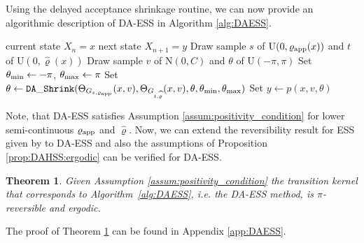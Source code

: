\documentclass[sn-mathphys-num]{sn-jnl}%
\theoremstyle{thmstyleone}%
\newtheorem{theorem}{Theorem}%
\theoremstyle{thmstyletwo}%
\theoremstyle{thmstylethree}%
\newcommand{\rhoapp}{\varrho_{{\rm app}}}
\newcommand{\change}[1]{\bgroup\color{black}#1\egroup}    %
\begin{document}
Using the delayed acceptance shrinkage routine, we can now provide an algorithmic description of DA-ESS in Algorithm \ref{alg:DAESS}.

\begin{algorithm}
	\caption{Delayed Acceptance Elliptical Slice Sampling}\label{alg:DAESS}
	\renewcommand{\algorithmicrequire}{\textbf{Input:}}
	\renewcommand{\algorithmicensure}{\textbf{Output:}}
	\begin{algorithmic}[1]
		\Require current state $X_n = x$
	    \Ensure next state $X_{n+1} = y$
		\State Draw sample $s$ of $\mathrm{U}(0,\rhoapp(x))$ and $t$ of $\mathrm{U}(0,\widehat{\varrho}(x))$
	    \State Draw sample $v$ of $\mathrm{N}(0,C)$ and $\theta$ of \change{$\mathrm{U}(-\pi,\pi)$}
	    \State Set $\theta_{\text{min}}\leftarrow \change{-\pi}$, $\theta_{\text{max}}\leftarrow \change{\pi}$
        \State Set $\theta \leftarrow \mathtt{DA\text{\_}Shrink}(\Theta_{G_{s,\rhoapp}}(x,v), \Theta_{G_{t,\widehat{\varrho}}}(x,v), \theta, \theta_{\text{min}}, \theta_{\text{max}})$
        \State Set $y \leftarrow p(x, v, \theta)$ 
	\end{algorithmic}
\end{algorithm}

\change{Note, that DA-ESS satisfies Assumption \ref{assum:positivity_condition} for lower semi-continuous $\rhoapp$ and $\widehat{\varrho}$. Now,} we can extend the reversibility result for ESS given by \citet{HasenpflugEtAl2023} to DA-ESS and also the \change{assumptions of Proposition \ref{prop:DAHSS:ergodic}} can be verified for DA-ESS.

\begin{theorem}\label{theo:DAESS}
\change{Given Assumption \ref{assum:positivity_condition}} the transition kernel that corresponds to Algorithm~\ref{alg:DAESS}, i.e. the DA-ESS method, is $\pi$-reversible and \change{ergodic}.
\end{theorem}
The proof of Theorem \ref{theo:DAESS} can be found in Appendix \ref{app:DAESS}.

\end{document}

